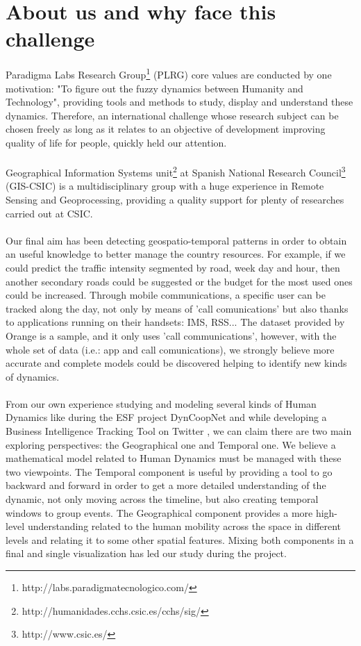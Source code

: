 \newpage

\section{About us and why face this challenge}

Paradigma Labs Research Group\footnote{http://labs.paradigmatecnologico.com/} (PLRG) core values are conducted by one motivation: "To figure out the fuzzy dynamics between Humanity and Technology", providing tools and methods to study, display and understand these dynamics. Therefore, an international challenge whose research subject can be chosen freely as long as it relates to an objective of development improving quality of life for people, quickly held our attention.
\\
\\
Geographical Information Systems unit\footnote{http://humanidades.cchs.csic.es/cchs/sig/} at Spanish National Research Council\footnote{http://www.csic.es/} (GIS-CSIC) is a multidisciplinary group with a huge experience in Remote Sensing and Geoprocessing, providing a quality support for plenty of researches carried out at CSIC.
\\
\\
Our final aim has been detecting geospatio-temporal patterns in order to obtain an useful knowledge to better manage the country resources. For example, if we could predict the traffic intensity segmented by road, week day and hour, then another secondary roads could be suggested or the budget for the most used ones could be increased. Through mobile communications, a specific user can be tracked along the day, not only by means of 'call comunications' but also thanks to applications running on their handsets: IMS, RSS... The dataset provided by Orange is a sample, and it only uses 'call communications', however, with the whole set of data (i.e.: app and call comunications), we strongly believe more accurate and complete models could be discovered helping to identify new kinds of dynamics.
\\
\\
From our own experience studying and modeling several kinds of Human Dynamics like during the ESF project DynCoopNet\citep{dyncoopnet2012} and while developing a Business Intelligence Tracking Tool on Twitter \citep{labselecciones}, we can claim there are two main exploring perspectives: the Geographical one and Temporal one. We believe a mathematical model related to Human Dynamics must be managed with these two viewpoints. The Temporal component is useful by providing a tool to go backward and forward in order to get a more detailed understanding of the dynamic, not only moving across the timeline, but also creating temporal windows to group events. The Geographical component provides a more high-level understanding related to the human mobility across the space in different levels and relating it to some other spatial features. Mixing both components in a final and single visualization has led our study during the project.
